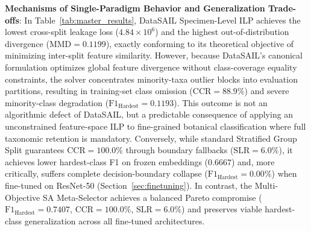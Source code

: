 \documentclass[a4paper,fleqn]{cas-sc}
\begin{document}
\textbf{Mechanisms of Single-Paradigm Behavior and Generalization Trade-offs}: In Table~\ref{tab:master_results}, \textsf{DataSAIL Specimen-Level ILP} achieves the lowest cross-split leakage loss ($4.84 \times 10^6$) and the highest out-of-distribution divergence ($\mathrm{MMD} = 0.1199$), exactly conforming to its theoretical objective of minimizing inter-split feature similarity. However, because DataSAIL's canonical formulation optimizes global feature divergence without class-coverage equality constraints, the solver concentrates minority-taxa outlier blocks into evaluation partitions, resulting in training-set class omission ($\mathrm{CCR} = 88.9\%$) and severe minority-class degradation ($\mathrm{F1}_{\text{Hardest}} = 0.1193$). This outcome is not an algorithmic defect of DataSAIL, but a predictable consequence of applying an unconstrained feature-space ILP to fine-grained botanical classification where full taxonomic retention is mandatory. Conversely, while standard \textsf{Stratified Group Split} guarantees $\mathrm{CCR}=100.0\%$ through boundary fallbacks ($\mathrm{SLR} = 6.0\%$), it achieves lower hardest-class F1 on frozen embeddings ($0.6667$) and, more critically, suffers complete decision-boundary collapse ($\mathrm{F1}_{\text{Hardest}} = 0.00\%$) when fine-tuned on ResNet-50 (Section~\ref{sec:finetuning}). In contrast, the Multi-Objective SA Meta-Selector achieves a balanced Pareto compromise ($\mathrm{F1}_{\text{Hardest}} = 0.7407$, $\mathrm{CCR} = 100.0\%$, $\mathrm{SLR} = 6.0\%$) and preserves viable hardest-class generalization across all fine-tuned architectures.
\end{document}
